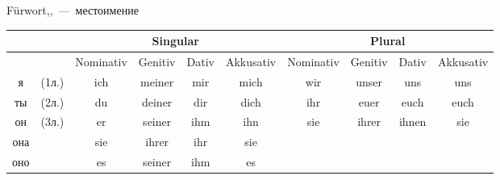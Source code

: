 
 F\"urwort,,~---~местоимение

\begin{longtable}{|cc|c|c|c|c|c|c|c|c|}
\hline
 & & \multicolumn{4}{|c|}{Singular} & \multicolumn{4}{|c|}{Plural} \\
\hline
 & & Nominativ & Genitiv & Dativ & Akkusativ & Nominativ & Genitiv & Dativ & Akkusativ \\
\hline
я & (1л.) & ich & meiner & mir & mich & wir & unser & uns & uns \\
\hline
ты & (2л.) & du & deiner & dir & dich & ihr & euer & euch & euch \\
\hline
он & \multirow{3}{*}{(3л.)} & er & seiner & ihm & ihn & \multirow{3}{*}{sie} & \multirow{3}{*}{ihrer} & \multirow{3}{*}{ihnen} & \multirow{3}{*}{sie} \\
она & & sie & ihrer & ihr & sie & & & & \\
оно & & es & seiner & ihm & es & & & & \\
\hline
\end{longtable}
